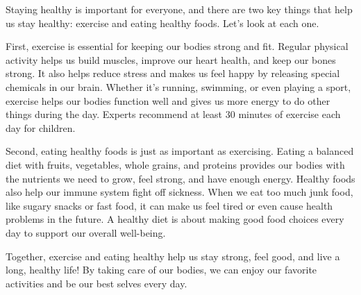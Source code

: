 \documentclass[12pt]{article}
\begin{document}
\vspace{1em}
\begin{tcolorbox}[colframe=black!60, colback=white, 
coltitle=black, colbacktitle=black!15, fonttitle=\bfseries\Large, 
title=Text: How to be Healthy, halign title=center, left=10pt, right=10pt, top=10pt, bottom=15pt]
Staying healthy is important for everyone, and there are two key things that help us stay healthy: exercise and eating healthy foods. Let’s look at each one.

First, exercise is essential for keeping our bodies strong and fit. Regular physical activity helps us build muscles, improve our heart health, and keep our bones strong. It also helps reduce stress and makes us feel happy by releasing special chemicals in our brain. Whether it's running, swimming, or even playing a sport, exercise helps our bodies function well and gives us more energy to do other things during the day. Experts recommend at least 30 minutes of exercise each day for children.

Second, eating healthy foods is just as important as exercising. Eating a balanced diet with fruits, vegetables, whole grains, and proteins provides our bodies with the nutrients we need to grow, feel strong, and have enough energy. Healthy foods also help our immune system fight off sickness. When we eat too much junk food, like sugary snacks or fast food, it can make us feel tired or even cause health problems in the future. A healthy diet is about making good food choices every day to support our overall well-being.

Together, exercise and eating healthy help us stay strong, feel good, and live a long, healthy life! By taking care of our bodies, we can enjoy our favorite activities and be our best selves every day.

 
\end{tcolorbox}
\end{document}
